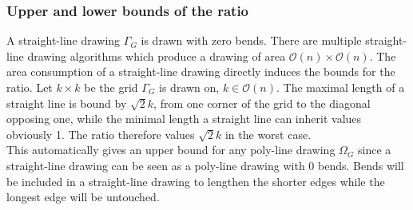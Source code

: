 \subsubsection{Upper and lower bounds of the ratio}
A straight-line drawing $\Gamma_G$ is drawn with zero bends. There are multiple straight-line drawing algorithms which produce a drawing of area $\mathcal{O}(n)\times\mathcal{O}(n)$. The area consumption of a straight-line drawing directly induces the bounds for the ratio. Let $k\times k$ be the grid $\Gamma_G$ is drawn on, $k\in \mathcal{O}(n)$. The maximal length of a straight line is bound by $\sqrt{2}k$, from one corner of the grid to the diagonal opposing one, while the minimal length a straight line can inherit values obviously 1. The ratio therefore values $\sqrt{2}k$ in the worst case.\\
This automatically gives an upper bound for any poly-line drawing $\Omega_G$ since a straight-line drawing can be seen as a poly-line drawing with 0 bends. Bends will be included in a straight-line drawing to lengthen the shorter edges while the longest edge will be untouched.
